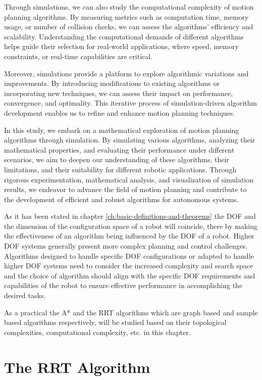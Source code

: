 Through simulations, we can also study the computational complexity of motion planning algorithms.
By measuring metrics such as computation time, memory usage, or number of collision checks, we can assess the algorithms' efficiency and scalability. Understanding the computational demands of different algorithms helps guide their selection for real-world applications, where speed, memory constraints, or real-time capabilities are critical.

Moreover, simulations provide a platform to explore algorithmic variations and improvements.
By introducing modifications to existing algorithms or incorporating new techniques, we can assess their impact on performance, convergence, and optimality.
This iterative process of simulation-driven algorithm development enables us to refine and enhance motion planning techniques.

In this study, we embark on a mathematical exploration of motion planning algorithms through simulation. By simulating various algorithms, analyzing their mathematical properties, and evaluating their performance under different scenarios, we aim to deepen our understanding of these algorithms, their limitations, and their suitability for different robotic applications.
Through rigorous experimentation, mathematical analysis, and visualization of simulation results, we endeavor to advance the field of motion planning and contribute to the development of efficient and robust algorithms for autonomous systems.

As it has been stated in chapter \ref{ch:basic-definitions-and-theorems} the DOF and the dimension of the configuration space of a robot will coincide, there by making the effectiveness of an algorithm being influenced by the DOF of a robot.
Higher DOF systems generally present more complex planning and control challenges.
Algorithms designed to handle specific DOF configurations or adapted to handle higher DOF systems need to consider the increased complexity and search space and the choice of algorithm should align with the specific DOF requirements and capabilities of the robot to ensure effective performance in accomplishing the desired tasks.

As a practical the A* and the RRT algorithms which are graph based and sample based algorithms respectively, will be studied based on their topological complexities, computational complexity, etc. in this chapter.

\section{The RRT Algorithm}

